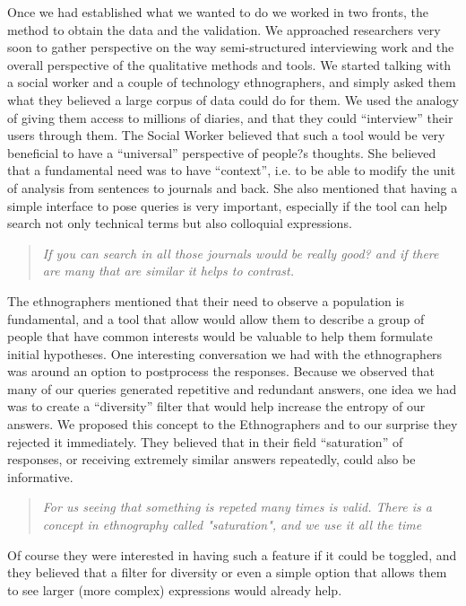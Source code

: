 \documentclass{sigchi}
\begin{document}
Once we had established what we wanted to do we worked in two fronts, the method to obtain the data and the validation. We approached researchers very soon to gather perspective on the way semi-structured interviewing work and the overall perspective of the qualitative methods and tools. We started talking with a social worker and a couple of technology ethnographers, and simply asked them what they believed a large corpus of data could do for them. We used the analogy of giving them access to millions of diaries, and that they could ``interview'' their users through them. The Social Worker believed that such a tool would be very beneficial to have a ``universal'' perspective of people?s thoughts. She believed that a fundamental need was to have ``context'', i.e. to be able to modify the unit of analysis from sentences to journals and back. She also mentioned that having a simple interface to pose queries is very important, especially if the tool can help search not only technical terms but also colloquial expressions. 

\begin{quote}
{\em
If you can search in all those journals would be really good? and if there are many that are similar it helps to contrast. 
}\end{quote}

The ethnographers mentioned that their need to observe a population is fundamental, and a tool that allow would allow them to describe a group of people that have common interests would be valuable to help them formulate initial hypotheses. One interesting conversation we had with the ethnographers was around an option to postprocess the responses. Because we observed that many of our queries generated repetitive and redundant answers, one idea we had was to create a ``diversity'' filter that would help increase the entropy of our answers. We proposed this concept to the Ethnographers and to our surprise they rejected it immediately. They believed that in their field ``saturation'' of responses, or receiving extremely similar answers repeatedly, could also be informative.

\begin{quote}
{\em
For us seeing that something is repeted many times is valid. There is a concept in ethnography called "saturation", and we use it all the time
}\end{quote}

Of course they were interested in having such a feature if it could be toggled, and they believed that a filter for diversity or even a simple option that allows them to see larger (more complex) expressions would already help.
\end{document}
